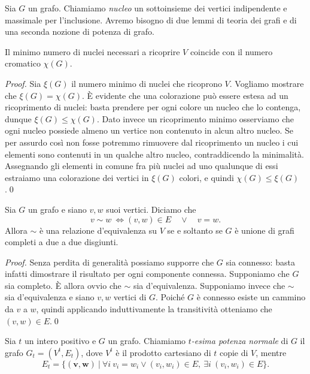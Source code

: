 Sia \(G\) un grafo. Chiamiamo \emph{nucleo} un sottoinsieme dei vertici indipendente e massimale per l'inclusione. Avremo bisogno di due lemmi di teoria dei grafi e di una seconda nozione di potenza di grafo. 
\begin{lemma}
  \label{minkernellemma} Il minimo numero di nuclei necessari a ricoprire \(V\) coincide con il numero cromatico \(\chi(G)\). 
\end{lemma}
\begin{proof}
  Sia \(\xi(G)\) il numero minimo di nuclei che ricoprono \(V\). Vogliamo mostrare che \(\xi(G)=\chi(G)\). È evidente che una colorazione può essere estesa ad un ricoprimento di nuclei: basta prendere per ogni colore un nucleo che lo contenga, dunque \(\xi(G)\le \chi(G)\). Dato invece un ricoprimento minimo osserviamo che ogni nucleo possiede almeno un vertice non contenuto in alcun altro nucleo. Se per assurdo così non fosse potremmo rimuovere dal ricoprimento un nucleo i cui elementi sono contenuti in un qualche altro nucleo, contraddicendo la minimalità. Assegnando gli elementi in comune fra più nuclei ad uno qualunque di essi estraiamo una colorazione dei vertici in \(\xi(G)\) colori, e quindi \(\chi(G)\le \xi(G)\).\qed 
\end{proof}
\begin{lemma}
  \label{releqlemma} Sia \(G\) un grafo e siano \(v,w\) suoi vertici. Diciamo che
  \[v\sim w\ \iff (v,w)\in E\quad\vee\quad v=w.\]
  Allora \(\sim\) è una relazione d'equivalenza su \(V\) se e soltanto se \(G\) è unione di grafi completi a due a due disgiunti. 
\end{lemma}
\begin{proof}
  Senza perdita di generalità possiamo supporre che \(G\) sia connesso: basta infatti dimostrare il risultato per ogni componente connessa. Supponiamo che \(G\) sia completo. \`E allora ovvio che \(\sim\) sia d'equivalenza. Supponiamo invece che \(\sim\) sia d'equivalenza e siano \(v,w\) vertici di \(G\). Poiché \(G\) è connesso esiste un cammino da \(v\) a \(w\), quindi applicando induttivamente la transitività otteniamo che \((v,w)\in E\).\qed 
\end{proof}
\begin{definition}
  Sia \(t\) un intero positivo e \(G\) un grafo. Chiamiamo \emph{\(t\)-esima potenza normale} di \(G\) il grafo \(G_t=(V^t, E_t)\), dove \(V^t\) è il prodotto cartesiano di \(t\) copie di \(V\), mentre
  \[E_t=\{(\mathbf{v},\mathbf{w})\ \vert\ \forall i\ v_i = w_i\vee (v_i, w_i)\in E,\ \exists i\ (v_i,w_i)\in E\}.\]
\end{definition}
